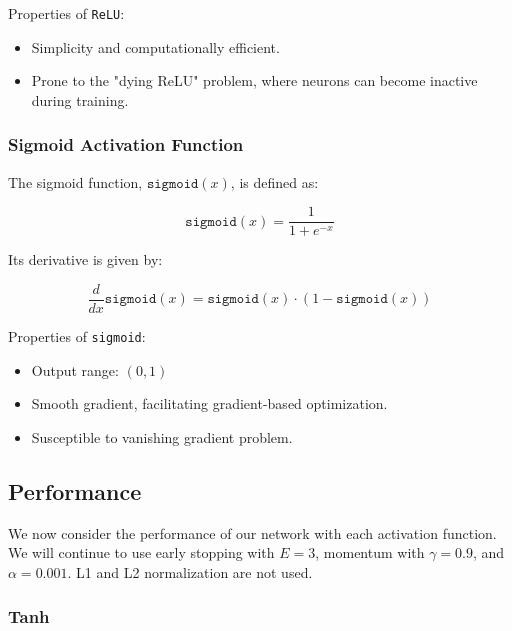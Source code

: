 Properties of \texttt{ReLU}:
\begin{itemize}
	\item Simplicity and computationally efficient.
	\item Prone to the "dying ReLU" problem, where neurons can become inactive during training.
\end{itemize}

\subsubsection{Sigmoid Activation Function}

The sigmoid function, \(\texttt{sigmoid}(x)\), is defined as:

\[
	\texttt{sigmoid}(x) = \frac{1}{1 + e^{-x}}
\]

Its derivative is given by:

\[
	\frac{d}{dx} \texttt{sigmoid}(x) = \texttt{sigmoid}(x) \cdot (1 - \texttt{sigmoid}(x))
\]

Properties of \texttt{sigmoid}:
\begin{itemize}
	\item Output range: \((0, 1)\)
	\item Smooth gradient, facilitating gradient-based optimization.
	\item Susceptible to vanishing gradient problem.
\end{itemize}

\subsection{Performance}

We now consider the performance of our network with each activation function. We will
continue to use early stopping with $E = 3$, momentum with $\gamma = 0.9$, and $\alpha = 0.001$.
L1 and L2 normalization are not used.

\subsubsection{Tanh}

